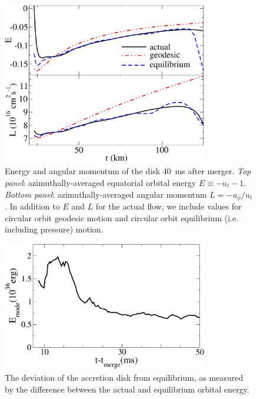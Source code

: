 \begin{figure}
\centering
\includegraphics[width=9cm]{Figures/EandL}
\caption[Radial profiles of disk orbital energy and angular momentum]{
Energy and angular momentum of the disk 40~ms after merger.
{\em Top panel}: azimuthally-averaged equatorial orbital energy
$E\equiv-u_t-1$.
{\em Bottom panel}: azimuthally-averaged angular momentum
$L=-u_{\phi}/u_{t}$.
In addition to $E$ and $L$ for the
actual flow, we include values for circular orbit geodesic motion and
circular orbit equilibrium (i.e. including pressure) motion.
}
\label{fig:equilibrium}
\end{figure}

\begin{figure}
\centering
\includegraphics[width=9cm]{Figures/ModeEnergy}
\caption[Disk equilibrium over time]{The deviation of the accretion disk from
equilibrium, as measured by the difference between the
actual and equilibrium orbital energy.}
\label{fig:mode}
\end{figure}


